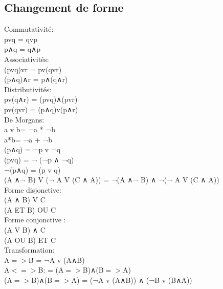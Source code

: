 \subsection{Changement de forme}
\vspace{5mm} %
Commutativité: \\
pvq = qvp \\
p∧q = q∧p \\

\vspace{5mm} %
Associativités: \\
(pvq)vr = pv(qvr) \\
(p∧q)∧r = p∧(q∧r) \\

\vspace{5mm} %
Distributivités: \\
pv(q∧r) = (pvq)∧(pvr) \\
pv(qvr) = (p∧q)v(p∧r) \\

\vspace{5mm} %
De Morgans: \\
a v b= ¬a * ¬b\\
a*b= ¬a + ¬b\\
(p∧q) = ¬p v ¬q  \\
(pvq) = ¬ (¬p ∧ ¬q)  \\
¬(p∧q) = (p v q)  \\
(A ∧¬ B) V (¬ A V (C ∧ A)) =  ¬(A ∧¬ B) ∧ ¬(¬ A V (C ∧ A))\\

\vspace{5mm} %
Forme disjonctive: \\
(A ∧ B) V C\\
(A ET B) OU C \\

\vspace{5mm} %
Forme conjonctive : \\
(A V B) ∧ C\\
(A OU B) ET C \\

\vspace{5mm} %
Transformation: \\
A$=>$B = ¬A v (A∧B) \\
A$<=>$B: = (A$=>$B)∧(B$=>$A)  \\
(A$=>$B)∧(B$=>$A) = (¬A v (A∧B)) ∧ (¬B v (B∧A))
